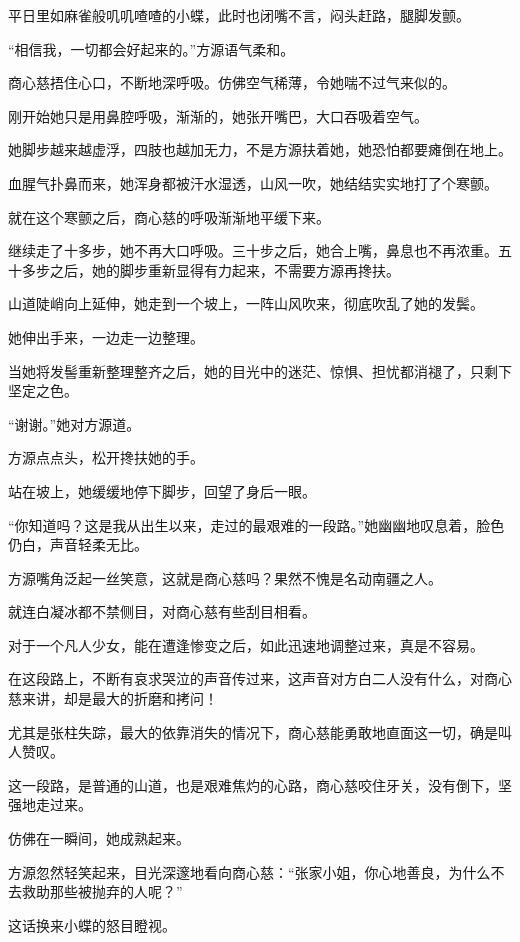 \begin{this_body}
平日里如麻雀般叽叽喳喳的小蝶，此时也闭嘴不言，闷头赶路，腿脚发颤。

“相信我，一切都会好起来的。”方源语气柔和。

商心慈捂住心口，不断地深呼吸。仿佛空气稀薄，令她喘不过气来似的。

刚开始她只是用鼻腔呼吸，渐渐的，她张开嘴巴，大口吞吸着空气。

她脚步越来越虚浮，四肢也越加无力，不是方源扶着她，她恐怕都要瘫倒在地上。

血腥气扑鼻而来，她浑身都被汗水湿透，山风一吹，她结结实实地打了个寒颤。

就在这个寒颤之后，商心慈的呼吸渐渐地平缓下来。

继续走了十多步，她不再大口呼吸。三十步之后，她合上嘴，鼻息也不再浓重。五十多步之后，她的脚步重新显得有力起来，不需要方源再搀扶。

山道陡峭向上延伸，她走到一个坡上，一阵山风吹来，彻底吹乱了她的发鬓。

她伸出手来，一边走一边整理。

当她将发髻重新整理整齐之后，她的目光中的迷茫、惊惧、担忧都消褪了，只剩下坚定之色。

“谢谢。”她对方源道。

方源点点头，松开搀扶她的手。

站在坡上，她缓缓地停下脚步，回望了身后一眼。

“你知道吗？这是我从出生以来，走过的最艰难的一段路。”她幽幽地叹息着，脸色仍白，声音轻柔无比。

方源嘴角泛起一丝笑意，这就是商心慈吗？果然不愧是名动南疆之人。

就连白凝冰都不禁侧目，对商心慈有些刮目相看。

对于一个凡人少女，能在遭逢惨变之后，如此迅速地调整过来，真是不容易。

在这段路上，不断有哀求哭泣的声音传过来，这声音对方白二人没有什么，对商心慈来讲，却是最大的折磨和拷问！

尤其是张柱失踪，最大的依靠消失的情况下，商心慈能勇敢地直面这一切，确是叫人赞叹。

这一段路，是普通的山道，也是艰难焦灼的心路，商心慈咬住牙关，没有倒下，坚强地走过来。

仿佛在一瞬间，她成熟起来。

方源忽然轻笑起来，目光深邃地看向商心慈：“张家小姐，你心地善良，为什么不去救助那些被抛弃的人呢？”

这话换来小蝶的怒目瞪视。


\end{this_body}
